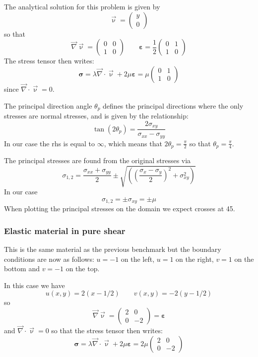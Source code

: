 The analytical solution for this problem is given by 
\[
\vec{\upnu}=
\left(
\begin{array}{c}
y \\
0 
\end{array}
\right)
\]
so that 
\[
\vec{\nabla}\vec{\upnu}=
\left(
\begin{array}{cc}
0 & 0 \\
1 & 0
\end{array}
\right)
\quad\quad
{\bm \varepsilon} = 
\frac{1}{2}
\left(
\begin{array}{cc}
0 & 1 \\
1 & 0
\end{array}
\right)
\]
The stress tensor then writes:
\[
{\bm \sigma}= \lambda \vec{\nabla}\cdot \vec{\upnu} + 2 \mu {\bm \varepsilon} 
= \mu 
\left(
\begin{array}{cc}
0 & 1 \\
1 & 0
\end{array}
\right)
\]
since $\vec{\nabla}\cdot \vec{\upnu}=0$.

The principal direction angle $\theta_p$ defines the principal
directions where the only stresses are normal stresses, and 
is given by the relationship:
\[
\tan (2\theta_p) =  \frac{2 \sigma_{xy}}{\sigma_{xx} -\sigma_{yy}}
\]
In our case the rhs is equal to $\infty$, which means that $2 \theta_p = \frac{\pi}{2}$
so that $\theta_p=\frac{\pi}{4}$.

The principal stresses are found from the original stresses via
\[
\sigma_{1,2}=\frac{\sigma_{xx}+\sigma_{yy}}{2} \pm \sqrt{  \left( \left(\frac{\sigma_x-\sigma_y}{2}\right)^2 +\sigma_{xy}^2  \right)}
\]
In our case 
\[
\sigma_{1,2} = \pm \sigma_{xy} = \pm \mu
\]
When plotting the principal stresses on the domain we expect crosses at 45\degree. 


\subsubsection{Elastic material in pure shear} \label{sec:elastpureshear}

This is the same material as the previous benchmark but the boundary conditions are 
now as follows: $u=-1$ on the left, $u=1$ on the right, $v=1$ on the bottom and $v=-1$
on the top. 

In this case we have 
\[
u(x,y)=2(x-1/2) 
\qquad
v(x,y)=-2(y-1/2) 
\]
so 
\[
\vec{\nabla}\vec{\upnu}=
\left(
\begin{array}{cc}
2 & 0 \\
0 & -2
\end{array}
\right)
={\bm \varepsilon}
\]
and $\vec{\nabla}\cdot \vec{\upnu}=0$ so that 
the stress tensor then writes:
\[
{\bm \sigma}= \lambda \vec{\nabla}\cdot \vec{\upnu} + 2 \mu {\bm \varepsilon} 
= 2\mu 
\left(
\begin{array}{cc}
2 & 0 \\
0 & -2
\end{array}
\right)
\]

